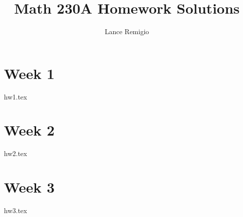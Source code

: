 \documentclass{report}
\title{Math 230A Homework Solutions}
\author{Lance Remigio}
\begin{document}
\maketitle 
\tableofcontents

\lhead{\rightmark}
\rhead{\thepage}

\section{Week 1}

{hw1.tex}

\section{Week 2}

{hw2.tex}

\section{Week 3}

{hw3.tex}

%
\end{document}
